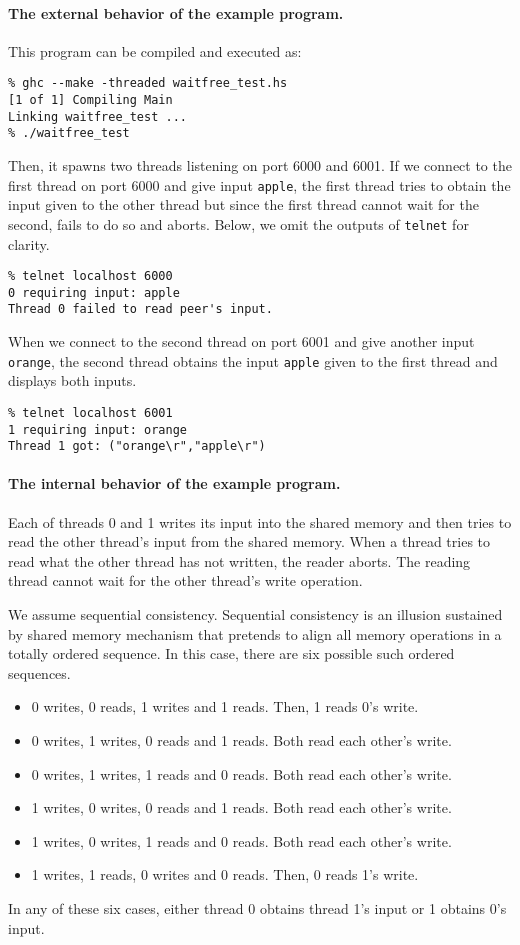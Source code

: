 \paragraph{The external behavior of the example program.}
  This program can be compiled and executed as:
\begin{verbatim}
% ghc --make -threaded waitfree_test.hs
[1 of 1] Compiling Main
Linking waitfree_test ...
% ./waitfree_test
\end{verbatim}
Then, it spawns two threads listening on port 6000 and 6001.
If we connect to the first thread on port 6000 and
give input \texttt{apple}, the first thread tries to obtain the input
given to the other
thread but since the first thread cannot wait for the second,
fails to do so and aborts.  Below, we omit the outputs of
\texttt{telnet} for clarity.
\begin{verbatim}
% telnet localhost 6000
0 requiring input: apple
Thread 0 failed to read peer's input.
\end{verbatim}
When we connect to the second thread on port 6001 and give another
input \texttt{orange}, the second thread obtains the input \texttt{apple}
given to the first thread and displays both inputs.
\begin{verbatim}
% telnet localhost 6001
1 requiring input: orange
Thread 1 got: ("orange\r","apple\r")
\end{verbatim}

\paragraph{The internal behavior of the example program.}

Each of threads 0 and 1 writes its input into the shared memory and then
tries to read the other thread's input from the shared memory.  When
a thread tries to read what the other thread has not written, the reader aborts.
The reading thread cannot wait for the other thread's write
operation.

We assume sequential consistency.  Sequential consistency is an illusion
sustained by shared memory mechanism that pretends to align all memory
operations in a totally ordered sequence.  In this case, there are
six possible such ordered sequences.
\begin{itemize}
 \item 0 writes, 0 reads, 1 writes and 1 reads.  Then, 1 reads 0's write.
 \item 0 writes, 1 writes, 0 reads and 1 reads.  Both read each other's write.
 \item 0 writes, 1 writes, 1 reads and 0 reads.  Both read each other's write.
 \item 1 writes, 0 writes, 0 reads and 1 reads.  Both read each other's write.
 \item 1 writes, 0 writes, 1 reads and 0 reads.  Both read each other's write.
 \item 1 writes, 1 reads, 0 writes and 0 reads.  Then, 0 reads 1's write.
\end{itemize}
In any of these six cases, either thread 0 obtains thread 1's input or 1 obtains
0's input.

